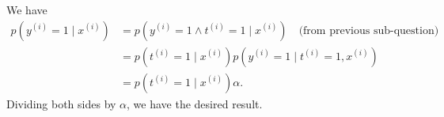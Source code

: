 \begin{answer}

	We have
	\begin{align*}
		p(y^{(i)} = 1\mid x^{(i)})
		& = p(y^{(i)} = 1\land t^{(i)} = 1\mid x^{(i)}) \quad\text{(from previous sub-question)}\\
		& = p(t^{(i)} = 1\mid x^{(i)})p(y^{(i)} = 1\mid t^{(i)} = 1, x^{(i)})\\
		& = p(t^{(i)} = 1\mid x^{(i)}) \alpha .
	\end{align*}
	Dividing both sides by $\alpha$, we have the desired result.
\end{answer}
